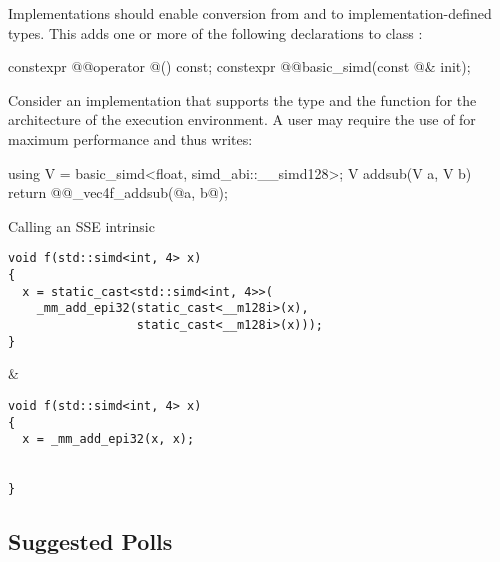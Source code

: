 \begin{wgText}
\setcounter{Paras}{2}%
\pnum\recommended
Implementations should enable  conversion from and to
implementation-defined types. This adds one or more of the following
declarations to class :

\begin{codeblock}
constexpr @@operator @\impdef@() const;
constexpr @@basic_simd(const @\impdef@& init);
\end{codeblock}

\begin{example}
  Consider an implementation that supports the type  and the function  for the architecture of the execution environment.
  A user may require the use of  for maximum performance and thus writes:
  \begin{codeblock}
    using V = basic_simd<float, simd_abi::__simd128>;
    V addsub(V a, V b) {
      return @@_vec4f_addsub(@a\wgRem{)}, b\wgRem{))}@);
    }
  \end{codeblock}
\end{example}
\end{wgText}

\begin{tonytable}{Calling an SSE intrinsic}\label{tt:intrinsic}
  \begin{lstlisting}
void f(std::simd<int, 4> x)
{
  x = static_cast<std::simd<int, 4>>(
    _mm_add_epi32(static_cast<__m128i>(x),
                  static_cast<__m128i>(x)));
}
  \end{lstlisting}
  &
  \begin{lstlisting}
void f(std::simd<int, 4> x)
{
  x = _mm_add_epi32(x, x);


}
  \end{lstlisting}
\end{tonytable}%

\subsection{Suggested Polls}


